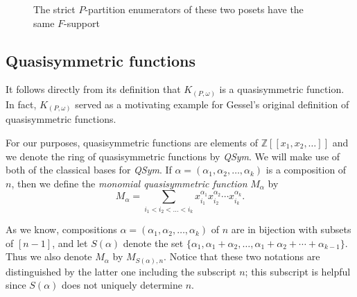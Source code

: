 \documentclass[ALCO,Unicode,published]{cedram}
\newcommand{\qsym}{{\it{QSym}}}
\newcommand{\om}{\omega}
\newcommand{\kpw}{K_{(P,\om)}}
\begin{document}
\begin{remark}
\begin{figure}
\begin{center}
\end{center}
\caption[caption]{The strict $P$-partition enumerators of these two posets have the same $F$-support}
\label{fig:f_support}
\end{figure}
\end{remark}


\subsection{Quasisymmetric functions}\label{sub:qsym}

It follows directly from its definition that $\kpw$ is a quasisymmetric function.  In fact, $\kpw$ served as a motivating example for Gessel's original definition \cite{Ges84} of quasisymmetric functions.   

For our purposes, quasisymmetric functions are elements of $\mathbb{Z}[[x_1, x_2, \ldots]]$ and we denote the ring of quasisymmetric functions by \qsym. We will make use of both of the classical bases for \qsym.  If $\alpha = (\alpha_1, \alpha_2, \ldots, \alpha_k)$ is a composition of $n$, then we define the \emph{monomial quasisymmetric function} $M_\alpha$ by
\[
M_\alpha = \sum_{i_1 < i_2 < \ldots < i_k} x_{i_1}^{\alpha_1} x_{i_2}^{\alpha_2} \cdots x_{i_k}^{\alpha_k}.
\]

As we know, compositions $\alpha = (\alpha_1, \alpha_2, \ldots, \alpha_k)$ of $n$ are in bijection with subsets of $[n-1]$, and let $S(\alpha)$ denote the set
$\{\alpha_1, \alpha_1+\alpha_2, \ldots, \alpha_1+\alpha_2 + \cdots+ \alpha_{k-1}\}$.  Thus we also denote $M_\alpha$ by $M_{S(\alpha), n}$.  Notice that these two notations are distinguished by the latter one including the subscript $n$; this subscript is helpful since $S(\alpha)$ does not uniquely determine $n$.  
\end{document}
